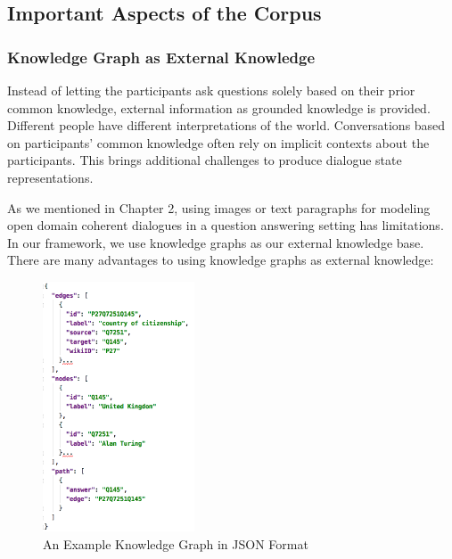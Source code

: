 \documentclass[bsc,frontabs,twoside,singlespacing,parskip,deptreport]{infthesis}     %
\begin{document}
\subsection{Important Aspects of the Corpus}
\subsubsection*{Knowledge Graph as External Knowledge}

Instead of letting the participants ask questions solely based on their prior common knowledge, external information as grounded knowledge is provided. Different people have different interpretations of the world. Conversations based on participants' common knowledge often rely on implicit contexts about the participants. This brings additional challenges to produce dialogue state representations.

As we mentioned in Chapter 2, using images or text paragraphs for modeling open domain coherent dialogues in a question answering setting \cite{strub2017end,shekhar2017foil,reddy2019coqa,zhou2018dataset,de2017guesswhat,das2017visual,das2017learning,reddy2019coqa} has limitations. In our framework, we use knowledge graphs as our external knowledge base. There are many advantages to using knowledge graphs as external knowledge:

\begin{figure}[h]
    \centering
    \includegraphics[width=0.4\textwidth]{gkjson.png}
    \caption{An Example Knowledge Graph in JSON Format}
    \label{fig:kgjson}
\end{figure}
\end{document}
